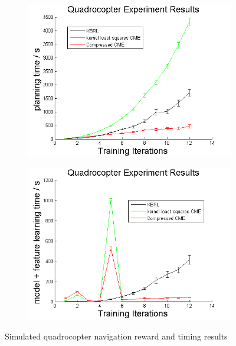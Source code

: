 \documentclass[letterpaper]{article}
\begin{document}
\begin{figure}[htb]
\centering
\begin{subfigure}[b]{0.3\textwidth}
\includegraphics[width=\textwidth]{Quadplanning.png}
\end{subfigure}
\begin{subfigure}[b]{0.3\textwidth}
\includegraphics[width=\textwidth]{Quadmodelfeature.png}
\end{subfigure}
\caption{Simulated quadrocopter navigation reward and timing results}
  \label{QuadTimefigs}
\end{figure}
\end{document}
